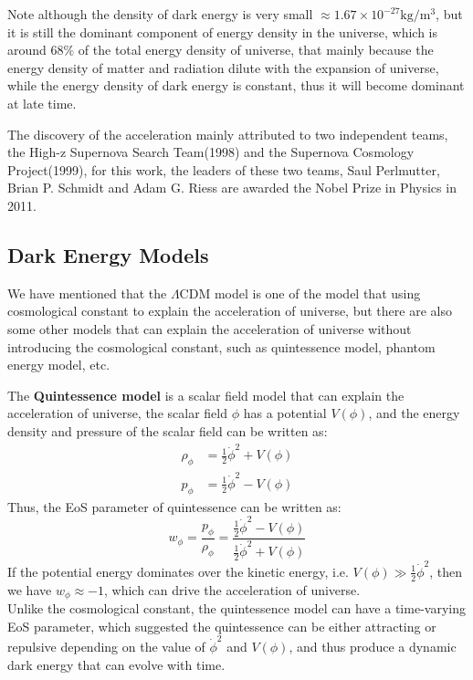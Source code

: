 \bigskip \noindent
\begin{remark}
    Note although the density of dark energy is very small $\approx 1.67 \times 10^{-27} \mathrm{kg/m^3}$, but it is still the dominant component of energy density in the universe, which is around $68\%$ of the total energy density of universe, that mainly because the energy density of matter and radiation dilute with the expansion of universe, while the energy density of dark energy is constant, thus it will become dominant at late time. \\
\end{remark}

\bigskip \noindent
\begin{extra}
    The discovery of the acceleration mainly attributed to two independent teams, the High-z Supernova Search Team(1998) and the Supernova Cosmology Project(1999), for this work, the leaders of these two teams, Saul Perlmutter, Brian P. Schmidt and Adam G. Riess are awarded the Nobel Prize in Physics in 2011. \\
\end{extra}

\clearpage
\subsection{Dark Energy Models}
We have mentioned that the $\Lambda$CDM model is one of the model that using cosmological constant to explain the acceleration of universe, but there are also some other models that can explain the acceleration of universe without introducing the cosmological constant, such as quintessence model, phantom energy model, etc. \\

\begin{theory}
    The \textbf{Quintessence model} is a scalar field model that can explain the acceleration of universe, the scalar field $\phi$ has a potential $V(\phi)$, and the energy density and pressure of the scalar field can be written as:
    \begin{align*}
        \rho_\phi &= \frac{1}{2} \dot{\phi}^2 + V(\phi) \\
        p_\phi &= \frac{1}{2} \dot{\phi}^2 - V(\phi)
    \end{align*}
    Thus, the EoS parameter of quintessence can be written as:
    \[
        w_\phi = \frac{p_\phi}{\rho_\phi} = \frac{\frac{1}{2} \dot{\phi}^2 - V(\phi)}{\frac{1}{2} \dot{\phi}^2 + V(\phi)}
    \]
    If the potential energy dominates over the kinetic energy, i.e. $V(\phi) \gg \frac{1}{2} \dot{\phi}^2$, then we have $w_\phi \approx -1$, which can drive the acceleration of universe. \\

    Unlike the cosmological constant, the quintessence model can have a time-varying EoS parameter, which suggested the quintessence can be either attracting or repulsive depending on the value of $\dot{\phi}^2$ and $V(\phi)$, and thus produce a dynamic dark energy that can evolve with time.
\end{theory}

